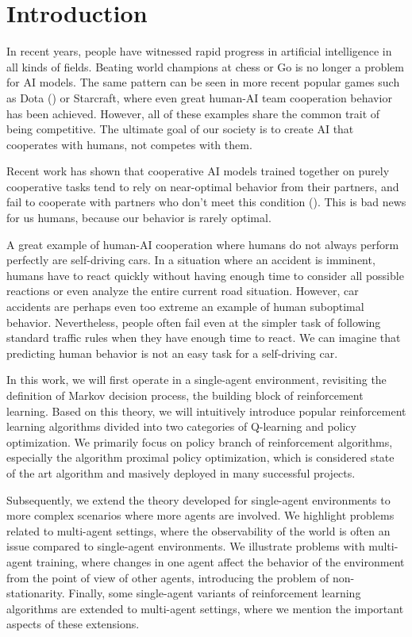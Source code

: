\chapter*{Introduction}

In recent years, people have witnessed rapid progress in artificial intelligence in all kinds of fields. 
Beating world champions at chess or Go is no longer a problem for AI models. 
The same pattern can be seen in more recent popular games such as Dota (\cite{DotaOpenFive}) or Starcraft, where even great human-AI team cooperation behavior has been achieved.
However, all of these examples share the common trait of being competitive.
The ultimate goal of our society is to create AI that cooperates with humans, not competes with them.

Recent work has shown that cooperative AI models trained together on purely cooperative tasks tend to rely on near-optimal behavior from their partners, and fail to cooperate with partners who don't meet this condition (\cite{carroll2020utility}).
This is bad news for us humans, because our behavior is rarely optimal.

A great example of human-AI cooperation where humans do not always perform perfectly are self-driving cars. 
In a situation where an accident is imminent, humans have to react quickly without having enough time to consider all possible reactions or even analyze the entire current road situation.
However, car accidents are perhaps even too extreme an example of human suboptimal behavior. 
Nevertheless, people often fail even at the simpler task of following standard traffic rules when they have enough time to react.
We can imagine that predicting human behavior is not an easy task for a self-driving car.

In this work, we will first operate in a single-agent environment, revisiting the definition of Markov decision process, the building block of reinforcement learning.
Based on this theory, we will intuitively introduce popular reinforcement learning algorithms divided into two categories of Q-learning and policy optimization.
We primarily focus on policy branch of reinforcement algorithms, especially the algorithm proximal policy optimization, which is considered state of the art algorithm and masively deployed in many successful projects.

Subsequently, we extend the theory developed for single-agent environments to more complex scenarios where more agents are involved.
We highlight problems related to multi-agent settings, where the observability of the world is often an issue compared to single-agent environments.
We illustrate problems with multi-agent training, where changes in one agent affect the behavior of the environment from the point of view of other agents, introducing the problem of non-stationarity.
Finally, some single-agent variants of reinforcement learning algorithms are extended to multi-agent settings, where we mention the important aspects of these extensions.


